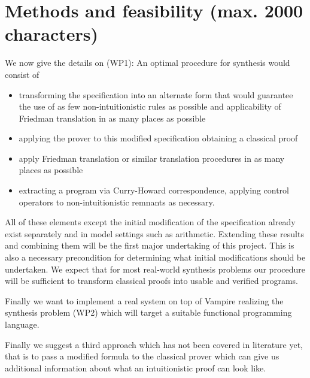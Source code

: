 \documentclass[a4paper,12pt]{article}
\begin{document}
	

\section{Methods and feasibility (max. 2000 characters)}
	
We now give the details on (WP1):
An optimal procedure for synthesis would consist of
\begin{itemize}
\item transforming the specification into an alternate form that would guarantee the use of as few non-intuitionistic rules as possible and applicability of Friedman translation in as many places as possible
\item applying the prover to this modified specification obtaining a classical proof
\item apply Friedman translation or similar translation procedures in as many places as possible
\item extracting a program via Curry-Howard correspondence, applying control operators to non-intuitionistic remnants as necessary.
\end{itemize}
All of these elements except the initial modification of the specification already exist separately and in model settings such as arithmetic. 
Extending these results and combining them will be the first major undertaking of this project. 
This is also a necessary precondition for determining what initial modifications should be undertaken. 
We expect that for most real-world synthesis problems our procedure will be sufficient to transform classical proofs into usable and verified programs.
	
Finally we want to implement a real system on top of Vampire realizing the synthesis problem (WP2) which will target a suitable functional programming language.

Finally we suggest a third approach which has not been covered in literature yet, that is to pass a modified formula to the classical prover which can give us additional information about what an intuitionistic proof can look like.
\end{document}
